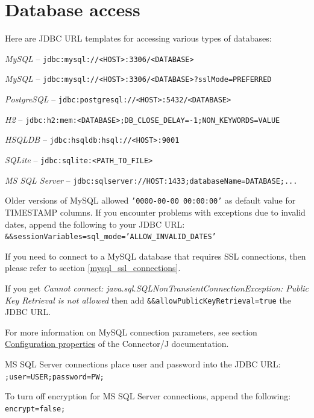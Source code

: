 \section{Database access}
\label{using_adams_database_access}
Here are JDBC URL templates for accessing various types of databases:
\begin{tight_itemize}
  \item \textit{MySQL} -- \texttt{jdbc:mysql://<HOST>:3306/<DATABASE>}
  \item \textit{MySQL} -- \texttt{jdbc:mysql://<HOST>:3306/<DATABASE>?sslMode=PREFERRED}
  \item \textit{PostgreSQL} -- \texttt{jdbc:postgresql://<HOST>:5432/<DATABASE>}
  \item \textit{H2} -- \texttt{jdbc:h2:mem:<DATABASE>;DB\_CLOSE\_DELAY=-1;NON\_KEYWORDS=VALUE}
  \item \textit{HSQLDB} -- \texttt{jdbc:hsqldb:hsql://<HOST>:9001}
  \item \textit{SQLite} -- \texttt{jdbc:sqlite:<PATH\_TO\_FILE>}
  \item \textit{MS SQL Server} -- \verb|jdbc:sqlserver://HOST:1433;databaseName=DATABASE;...|
\end{tight_itemize}

\begin{tight_itemize}
    \item Older versions of MySQL allowed \texttt{'0000-00-00 00:00:00'} as default value for TIMESTAMP columns.
    If you encounter problems with exceptions due to invalid dates, append the following to your JDBC URL:
    \texttt{\&\&sessionVariables=sql\_mode='ALLOW\_INVALID\_DATES'}
    \item If you need to connect to a MySQL database that requires SSL connections, then please refer to
    section \ref{mysql_ssl_connections}.
    \item If you get \textit{Cannot connect: java.sql.SQLNonTransientConnectionException: Public Key Retrieval is not allowed}
    then add \texttt{\&\&allowPublicKeyRetrieval=true} the JDBC URL.
    \item For more information on MySQL connection parameters, see section \href{https://dev.mysql.com/doc/connector-j/en/connector-j-reference-configuration-properties.html}{Configuration properties}
    of the Connector/J documentation.
    \item MS SQL Server connections place user and password into the JDBC URL: \\
    \texttt{;user=USER;password=PW;}
    \item To turn off encryption for MS SQL Server connections, append the following: \\
    \texttt{encrypt=false;}
\end{tight_itemize}


